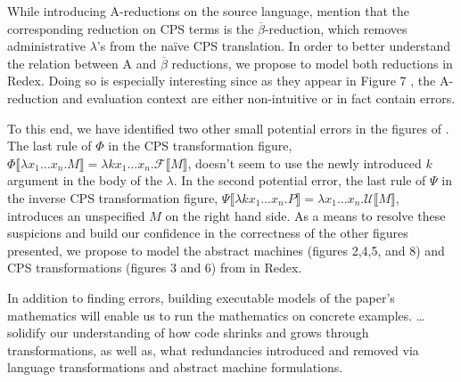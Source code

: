 \documentclass[11pt]{article}
\begin{document}
While introducing A-reductions on the source language, \citet{Flanagan:1993fk}
mention that the corresponding reduction on CPS terms is the
$\overline{\beta}$-reduction, which removes administrative $\lambda$'s from the
na\"{i}ve CPS translation.  In order to better understand the relation between
A and $\overline{\beta}$ reductions, we propose to model both reductions in
Redex.  Doing so is especially interesting since as they appear in Figure 7
\cite{Flanagan:1993fk}, the A-reduction and evaluation context are either
non-intuitive or in fact contain errors.

To this end, we have identified two other small potential errors in the figures
of \cite{Flanagan:1993fk}.  The last rule of $\Phi$ in the CPS transformation
figure, $\Phi \llbracket \lambda x_1 \ldots x_n . M \rrbracket = \lambda k x_1
\ldots x_n . \mathcal{F} \llbracket M \rrbracket$, doesn't seem to use the
newly introduced $k$ argument in the body of the $\lambda$.  In the second
potential error, the last rule of $\Psi$ in the inverse CPS transformation
figure, $\Psi \llbracket \lambda k x_1 \ldots x_n . P \rrbracket = \lambda x_1
\ldots x_n . \mathcal{U} \llbracket M \rrbracket$, introduces an unspecified
$M$ on the right hand side. As a means to resolve these suspicions and build
our confidence in the correctness of the other figures presented, we propose to
model the abstract machines (figures 2,4,5, and 8) and CPS transformations
(figures 3 and 6) from \cite{Flanagan:1993fk} in Redex.

In addition to finding errors, building executable models of the paper's
mathematics will enable us to run the mathematics on concrete examples. \ldots
solidify our understanding of how code shrinks and grows through
transformations, as well as, what redundancies introduced and removed via
language transformations and abstract machine formulations.




\end{document}
